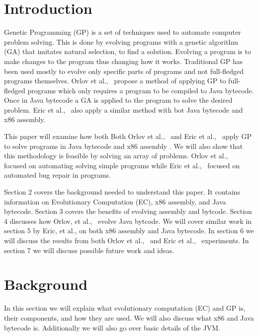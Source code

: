 \documentclass{sig-alternate}
\begin{document}

\section{Introduction}
Genetic Programming (GP) is a set of techniques used to automate computer problem solving. This is done by evolving programs with a genetic algorithm (GA) that imitates natural selection, to find a solution. Evolving a program is to make changes to the program thus changing how it works. Traditional GP has been used mostly to evolve only specific parts of programs and not full-fledged programs themselves. Orlov et al.,~\cite{FINCH2:2009} propose a method of applying GP to full-fledged programs which only requires a program to be compiled to Java bytecode. Once in Java bytecode a GA is applied to the program to solve the desired problem. Eric et al.,~\cite{Assembly:2010} also apply a similar method with bot Java bytecode and x86 assembly.\par
	This paper will examine how both Both Orlov et al.,~\cite{FINCH:2011} and Eric et al.,~\cite{Assembly:2010} apply GP to solve programs in Java bytecode and x86 assembly . We will also show that this methodology is feasible by solving an array of problems. Orlov et al.,~\cite{FINCH:2011} focused on automating solving simple programs while Eric et al.,~\cite{Assembly:2010} focused on automated bug repair in programs. 
	
Section 2 covers the background needed to understand this paper. It contains information on Evolutionary Computation (EC), x86 assembly, and Java bytecode. Section 3 covers the benefits of evolving assembly and bytcode. Section 4 discusses how Orlov, et al.,~\cite{FINCH:2011} evolve Java bytcode. We will cover similar work in section 5 by Eric, et al., on both x86 assembly and Java bytecode. In section 6 we will discuss the results from both Orlov et al.,~\cite{FINCH:2011} and Eric et al.,~\cite{Assembly:2010} experiments. In section 7 we will discuss possible future work and ideas.
	
	

\section{Background}
In this section we will explain what evolutionary computation (EC) and GP is, their components, and how they are used.
We will also discuss what x86 and Java bytecode is. Additionally we will also go over basic details of the JVM.
\end{document}
